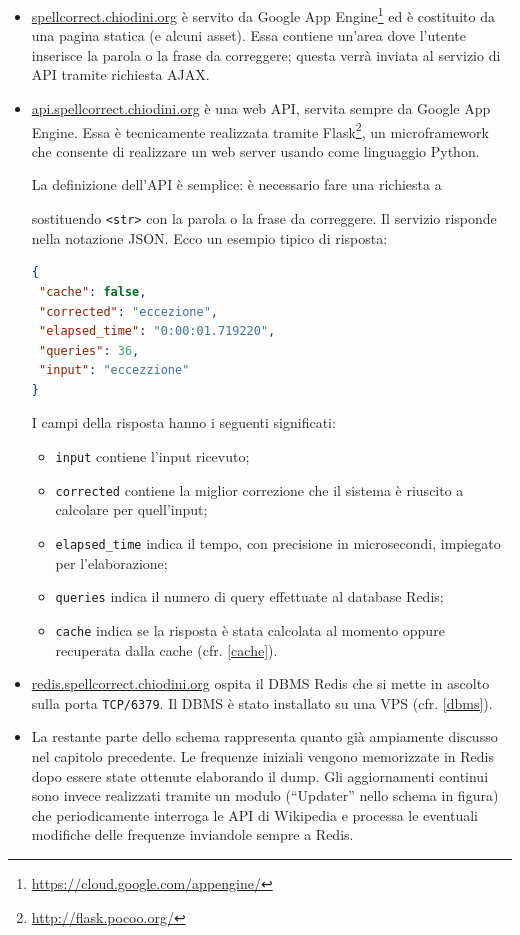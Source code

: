 \begin{itemize}
	\item 
\url{spellcorrect.chiodini.org} è servito da Google App Engine\footnote{\url{https://cloud.google.com/appengine/}} ed è costituito da una pagina statica (e alcuni asset). Essa contiene un'area dove l'utente inserisce la parola o la frase da correggere; questa verrà inviata al servizio di API tramite richiesta AJAX.
	\item 
\url{api.spellcorrect.chiodini.org} è una web API, servita sempre da Google App Engine. Essa è tecnicamente realizzata tramite Flask\footnote{\url{http://flask.pocoo.org/}}, un microframework che consente di realizzare un web server usando come linguaggio Python.

La definizione dell'API è semplice: è necessario fare una richiesta a

sostituendo \texttt{<str>} con la parola o la frase da correggere. Il servizio risponde nella notazione JSON. Ecco un esempio tipico di risposta:
\begin{lstlisting}[language=json, numbers=none]
{
 "cache": false,
 "corrected": "eccezione", 
 "elapsed_time": "0:00:01.719220",
 "queries": 36,
 "input": "eccezzione"
}
\end{lstlisting}
I campi della risposta hanno i seguenti significati:
\begin{itemize}
\item \texttt{input} contiene l'input ricevuto;
\item \texttt{corrected} contiene la miglior correzione che il sistema è riuscito a calcolare per quell'input;
\item \texttt{elapsed\_time} indica il tempo, con precisione in microsecondi, impiegato per l'elaborazione;
\item \texttt{queries} indica il numero di query effettuate al database Redis;
\item \texttt{cache} indica se la risposta è stata calcolata al momento oppure recuperata dalla cache (cfr. \ref{cache}).
\end{itemize}

\item
\url{redis.spellcorrect.chiodini.org} ospita il DBMS Redis che si mette in ascolto sulla porta \texttt{TCP/6379}. Il DBMS è stato installato su una VPS (cfr. \ref{dbms}). 

\item
La restante parte dello schema rappresenta quanto già ampiamente discusso nel capitolo precedente. Le frequenze iniziali vengono memorizzate in Redis dopo essere state ottenute elaborando il dump. Gli aggiornamenti continui sono invece realizzati tramite un modulo (``Updater'' nello schema in figura) che periodicamente interroga le API di Wikipedia e processa le eventuali modifiche delle frequenze inviandole sempre a Redis.
\end{itemize}

